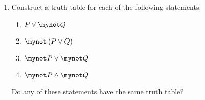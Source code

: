 \begin{enumerate}
\begin{multicols}{2}
\begin{enumerate}
\item $P$

\yitem $P \wedge R$

\item $R \to \mynot P$
\end{enumerate}
\end{multicols}


%
%
%
%



\xitem \label{exer:sec22-5}%
Construct a truth table for each of the following statements: 
\begin{multicols}{2}
  \begin{enumerate}
    \item $P \to Q$
    \item $Q \to P$
    \item $\mynot  P \to \mynot  Q$
    \item $\mynot  Q \to \mynot  P$
  \end{enumerate}
  \end{multicols}
  Do any of these statements have the same truth table?

\item Construct a truth table for each of the following statements: \label{exer:sec22-4}
  \begin{multicols}{2}
  \begin{enumerate}
    \item $P \vee \mynot  Q$
    \item $\mynot  \left( {P \vee Q} \right)$
    \item $\mynot  P \vee \mynot  Q$
    \item $\mynot  P \wedge \mynot  Q$
  \end{enumerate}
  \end{multicols}
  Do any of these statements have the same truth table?



\end{enumerate}
